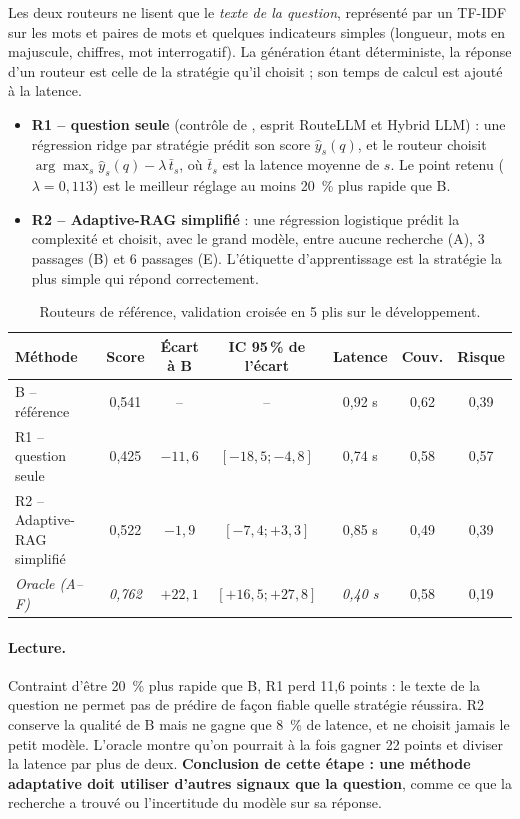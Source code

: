 \documentclass[11pt,a4paper]{article}
\begin{document}
Les deux routeurs ne lisent que le \emph{texte de la question}, représenté par un TF-IDF sur les mots
et paires de mots et quelques indicateurs simples (longueur, mots en majuscule, chiffres, mot
interrogatif). La génération étant déterministe, la réponse d'un routeur est celle de la stratégie qu'il
choisit ; son temps de calcul est ajouté à la latence.
\begin{itemize}
\item \textbf{R1 -- question seule} (contrôle de \citealp{li2026beyond}, esprit RouteLLM et Hybrid LLM) :
une régression ridge par stratégie prédit son score $\hat{y}_s(q)$, et le routeur choisit
$\arg\max_s \hat{y}_s(q) - \lambda\,\bar{t}_s$, où $\bar{t}_s$ est la latence moyenne de $s$. Le point
retenu ($\lambda = 0{,}113$) est le meilleur réglage au moins 20~\% plus rapide que B.
\item \textbf{R2 -- Adaptive-RAG simplifié} \citep{jeong2024adaptiverag} : une régression logistique
prédit la complexité et choisit, avec le grand modèle, entre aucune recherche (A), 3 passages (B) et
6 passages (E). L'étiquette d'apprentissage est la stratégie la plus simple qui répond correctement.
\end{itemize}

\begin{table}[H]
\centering\small
\begin{tabular}{l c c c c c c}
\toprule
\textbf{Méthode} & \textbf{Score} & \textbf{Écart à B} & \textbf{IC 95\,\% de l'écart} & \textbf{Latence} & \textbf{Couv.} & \textbf{Risque} \\
\midrule
B -- référence & 0,541 & -- & -- & 0,92 s & 0,62 & 0,39 \\
R1 -- question seule & 0,425 & $-11{,}6$ & $[-18{,}5 ; -4{,}8]$ & 0,74 s & 0,58 & 0,57 \\
R2 -- Adaptive-RAG simplifié & 0,522 & $-1{,}9$ & $[-7{,}4 ; +3{,}3]$ & 0,85 s & 0,49 & 0,39 \\
\textit{Oracle (A--F)} & \textit{0,762} & $+22{,}1$ & $[+16{,}5 ; +27{,}8]$ & \textit{0,40 s} & 0,58 & 0,19 \\
\bottomrule
\end{tabular}
\caption{Routeurs de référence, validation croisée en 5 plis sur le développement.}
\label{tab:routeurs}
\end{table}

\paragraph{Lecture.} Contraint d'être 20~\% plus rapide que B, R1 perd 11,6 points : le texte de la
question ne permet pas de prédire de façon fiable quelle stratégie réussira. R2 conserve la qualité de B
mais ne gagne que 8~\% de latence, et ne choisit jamais le petit modèle. L'oracle montre qu'on pourrait
à la fois gagner 22 points et diviser la latence par plus de deux. \textbf{Conclusion de cette étape :
une méthode adaptative doit utiliser d'autres signaux que la question}, comme ce que la recherche a
trouvé ou l'incertitude du modèle sur sa réponse.
\end{document}

